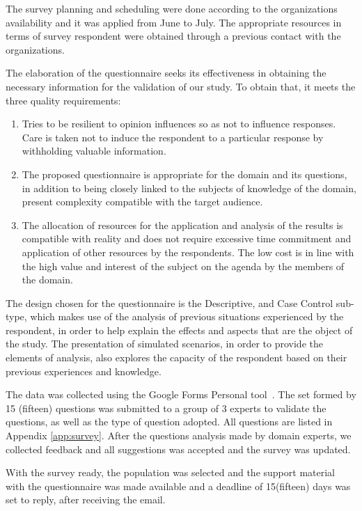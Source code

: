The survey planning and scheduling were done according to the organizations availability and it was applied from June to July. The appropriate resources in terms of survey respondent were obtained through a previous contact with the organizations.

The elaboration of the questionnaire seeks its effectiveness in obtaining the necessary information for the validation of our study. To obtain that, it meets the three quality requirements:

\begin{enumerate}
    \item Tries to be resilient to opinion influences so as not to influence responses. Care is taken not to induce the respondent to a particular response by withholding valuable information.
    \item The proposed questionnaire is appropriate for the domain and its questions, in addition to being closely linked to the subjects of knowledge of the domain, present complexity compatible with the target audience.
    \item The allocation of resources for the application and analysis of the results is compatible with reality and does not require excessive time commitment and application of other resources by the respondents. The low cost is in line with the high value and interest of the subject on the agenda by the members of the domain.
\end{enumerate}

The design chosen for the questionnaire is the Descriptive, and Case Control sub-type, which makes use of the analysis of previous situations experienced by the respondent, in order to help explain the effects and aspects that are the object of the study. The presentation of simulated scenarios, in order to provide the elements of analysis, also explores the capacity of the respondent based on their previous experiences and knowledge.

The data was collected using the Google Forms Personal tool~\cite{Google2020}. The set formed by 15 (fifteen) questions was submitted to a group of 3 experts to validate the questions, as well as the type of question adopted. All questions are listed in Appendix \ref{app:survey}. After the questions analysis made by domain experts, we collected feedback and all suggestions was accepted and the survey was updated.

With the survey ready, the population was selected and the support material with the questionnaire was made available and a deadline of 15(fifteen) days was set to reply, after receiving the email.




